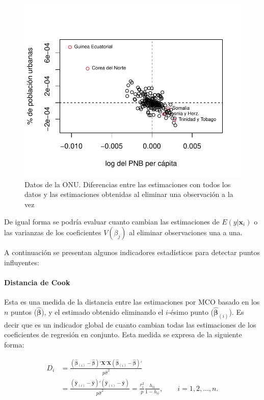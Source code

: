 \documentclass[
]{article}
\begin{document}
\begin{figure}

{\centering \includegraphics{MLGI_files/figure-latex/Un11valAtipElim-1} 

}

\caption{Datos de la ONU. Diferencias entre las estimaciones con todos los datos y las estimaciones obtenidas al eliminar una observación a la vez}\label{fig:Un11valAtipElim}
\end{figure}

De igual forma se podría evaluar cuanto cambian las estimaciones de \(E(y|\boldsymbol x_{i})\) o las varianzas de los coeficientes \(V(\beta_{j})\) al eliminar observaciones una a una.

A continuación se presentan algunos indicadores estadísticos para detectar puntos influyentes:

\hypertarget{distancia-de-cook}{%
\paragraph{Distancia de Cook}\label{distancia-de-cook}}

Esta es una medida de la distancia entre las estimaciones por MCO basado en los \(n\) puntos (\(\hat{\boldsymbol \beta}\)), y el estimado obtenido eliminando el \(i\)-ésimo punto (\(\hat{\boldsymbol \beta}_{(i)}\)). Es decir que es un indicador global de cuanto cambian todas las estimaciones de los coeficientes de regresión en conjunto. Esta medida se expresa de la siguiente forma:

\begin{equation}
\begin{split}
D_{i} &= \frac{(\hat{\boldsymbol \beta}_{(i)}-\hat{\boldsymbol \beta})'\boldsymbol X'\boldsymbol X(\hat{\boldsymbol \beta}_{(i)}-\hat{\boldsymbol \beta})'}{p \hat{\sigma}^{2}}   \\
      &= \frac{(\hat{\boldsymbol y}_{(i)} - \hat{\boldsymbol y} )'(\hat{\boldsymbol y}_{(i)} - \hat{\boldsymbol y} )}{p\hat{\sigma}^{2}} = \frac{r_{i}^{2}}{p}\frac{h_{ii}}{1-h_{ii}}, \qquad i=1,2,\ldots,n.
\end{split} \nonumber
\end{equation}
\end{document}
